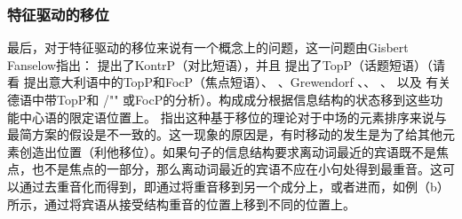 \subsubsection{特征驱动的移位}
\label{sec-feature-driven-movement}

最后，对于特征驱动的移位来说有一个概念上的问题，这一问题由Gisbert Fanselow指出：\mbox{} \citet[]{Frey2004a}提出了KontrP（对比短语），并且 \citet{Frey2004b-u}提出了TopP（话题短语）（请看 提出意大利语中的TopP和FocP（焦点短语）、 
 、Grewendorf \citeyearpar[, 240]{Grewendorf2002a}、\citeyear{Grewendorf2009a}、 、 以及 有关德语中带TopP和 /"" 或FocP的分析）。构成成分根据信息结构的状态移到这些功能中心语的限定语位置上。 \citet{Fanselow2003b}指出这种基于移位的理论对于中场的元素排序来说与最简方案\indexmpc 的假设是不一致的。这一现象的原因是，有时移动的发生是为了给其他元素创造出位置（利他移位）。如果句子的信息结构要求离动词最近的宾语既不是焦点，也不是焦点的一部分，那么离动词最近的宾语不应在小句处得到最重音。这可以通过去重音化而得到，即通过将重音移到另一个成分上，或者进而，如例（b）所示，通过将宾语从接受结构重音的位置上移到不同的位置上。
